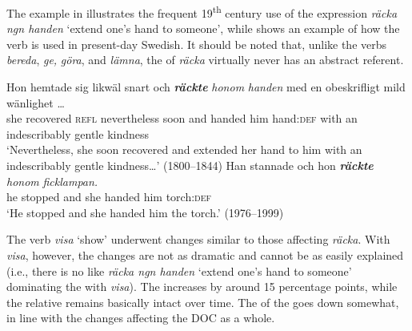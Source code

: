 \documentclass[output=paper]{langscibook}
\begin{document}
\begin{table}
\caption{Frequency measures of the verb-specific DOC with \textit{räcka} ‘hand’}
\label{tab:valdeson:12}
\end{table}

The example in  illustrates the frequent 19\textsuperscript{th} century use of the expression \textit{räcka ngn handen} ‘extend one's hand to someone’, while  shows an example of how the verb is used in present-day Swedish. It should be noted that, unlike the verbs \textit{bereda}, \textit{ge,} \textit{göra}, and \textit{lämna}, the  of \textit{räcka} virtually never has an abstract referent.


\ea \label{ex:valdeson:16}
\gll Hon hemtade   sig     likwäl        snart  och \textbf{\textit{räckte}} \textit{honom}  \textit{handen} med  en  obeskrifligt    mild    wänlighet …\\
  she  recovered  \textsc{refl}  nevertheless    soon  and  handed him   hand\textsc{:def} with  an  indescribably  gentle  kindness\\
\glt ‘Nevertheless, she soon recovered and extended her hand to him with an indescribably gentle kindness…’ (1800–1844)
\ex \label{ex:valdeson:17}
\gll Han  stannade och  hon \textbf{\textit{räckte}} \textit{honom}      \textit{ficklampan.}\\
  he        stopped  and   she handed him         torch:\textsc{def}\\
\glt `He stopped and she handed him the torch.’ (1976–1999)
\z


\label{sec:valdeson:5.3.2.2}
The verb \textit{visa} ‘show’ underwent changes similar to those affecting \textit{räcka}. With \textit{visa}, however, the changes are not as dramatic and cannot be as easily explained (i.e., there is no  like \textit{räcka ngn handen} ‘extend one's hand to someone’ dominating the  with \textit{visa}). The  increases by around 15 percentage points, while the relative  remains basically intact over time. The  of the  goes down somewhat, in line with the changes affecting the DOC as a whole.
\end{document}
